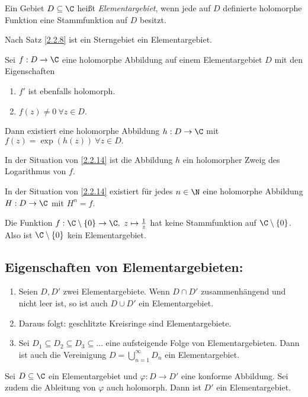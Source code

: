 \lecture
		\begin{defn}[Elementargebiet]
			Ein Gebiet $ D \subseteq \C $ heißt \emph{Elementargebiet}, wenn jede auf $D$ definierte holomorphe Funktion eine Stammfunktion auf $D$ besitzt.
		\end{defn}
		
		\begin{exmp}
			Nach Satz \ref{2.2.8} ist ein Sterngebiet ein Elementargebiet.
		\end{exmp}
		
		\begin{thm}\label{2.2.14}
			Sei $ f: D \to \C $ eine holomorphe Abbildung auf einem Elementargebiet $D$ mit den Eigenschaften
			\begin{enumerate}[label={\roman*})]
				\item $f'$ ist ebenfalls holomorph.
				\item $ f(z) \neq 0 \ \forall z \in D $.
			\end{enumerate}
			Dann existiert eine holomorphe Abbildung $ h: D \to \C $ mit $ f(z) = \exp(h(z)) \ \forall z \in D. $
		\end{thm}
		
		\begin{rem*}
			In der Situation von \ref{2.2.14} ist die Abbildung $h$ ein holomorpher Zweig des Logarithmus von $f$.
		\end{rem*}
		
		\begin{cor}
			In der Situation von \ref{2.2.14} existiert für jedes $ n \in \N $ eine holomorphe Abbildung $ H: D \to \C $ mit $ H^n = f $.
		\end{cor}
		
		\begin{exmp}
			Die Funktion $ f: \C \setminus\{0\} \to \C,\ z \mapsto \frac{1}{z} $ hat keine Stammfunktion auf $ \C \setminus\{0\} $. Also ist $ \C\setminus\{0\} $ kein Elementargebiet.
		\end{exmp}
		
		\subsection*{Eigenschaften von Elementargebieten:}
		\begin{enumerate}
			\item Seien $ D,D' $ zwei Elementargebiete. Wenn $ D \cap D' $ zusammenhängend und nicht leer ist, so ist auch $ D \cup D' $ ein Elementargebiet.
			\item Daraus folgt: geschlitzte Kreisringe sind Elementargebiete.
			\item Sei $ D_1 \subseteq D_2 \subseteq D_3 \subseteq \dots $ eine aufsteigende Folge von Elementargebieten. Dann ist auch die Vereinigung $ D = \bigcup_{n=1}^\infty D_n $ ein Elementargebiet.
		\end{enumerate}
		
		\begin{prop}
			Sei $ D \subseteq \C $ ein Elementargebiet und $ \varphi: D \to D' $ eine konforme Abbildung. Sei zudem die Ableitung von $\varphi$ auch holomorph. Dann ist $D'$ ein Elementargebiet.
		\end{prop}